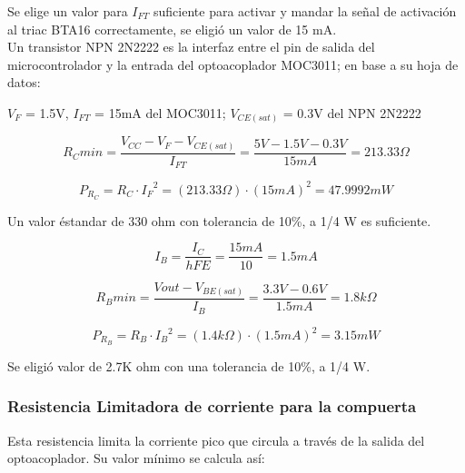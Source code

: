    Se elige un valor para $I_{FT}$ suficiente para activar y mandar la señal de activación al triac BTA16 correctamente, se eligió un valor de 15 mA.\\
    
    Un transistor NPN 2N2222 es la interfaz entre el pin de salida del microcontrolador y la entrada del optoacoplador MOC3011; en base a su hoja de datos:
    
    $V_F$ = 1.5V, $I_{FT}$ = 15mA del MOC3011;  $V_{CE(sat)}$ = 0.3V del NPN 2N2222
    
    \begin{equation}
        R_{C}min 
        =   \frac { V_{CC} - V_{F} - V_{CE(sat)} } { I_{FT} }
        =   \frac { 5V - 1.5V - 0.3V } { 15mA }
        =   213.33\Omega
    \end{equation}
     
    \begin{equation}
        P_{ R_{C} }
        =   R_{C} \cdot {I_{F}}^2
        =   (213.33\Omega) \cdot (15mA)^2
        =   47.9992mW
    \end{equation}
    
    \begin{center}
        Un valor éstandar de 330 ohm con tolerancia de 10\%, a 1/4 W es suficiente.\\
    \end{center}

    \begin{equation}
        I_{B}   
        =   \frac { I_{C} } { hFE }
        =   \frac { 15mA } { 10 }
        =   1.5mA
    \end{equation}

    \begin{equation}
        R_{B}min   
        =   \frac { Vout - V_{BE(sat)} } { I_{B} }
        =   \frac { 3.3V - 0.6V } { 1.5mA }
        =   1.8k\Omega
    \end{equation}
    
    \begin{equation}
        P_{R_{B}}
        =   R_{B} \cdot {I_{B}}^2
        =   (1.4k\Omega) \cdot (1.5mA)^2
        =   3.15mW
    \end{equation}
    
    \begin{center}
        Se eligió valor de 2.7K ohm con una tolerancia de 10\%, a 1/4 W.\\
    \end{center}
    
    \subsubsection*{Resistencia Limitadora de corriente para la compuerta}
        Esta resistencia limita la corriente pico que circula a través de la salida del optoacoplador. Su valor mínimo se calcula así:

